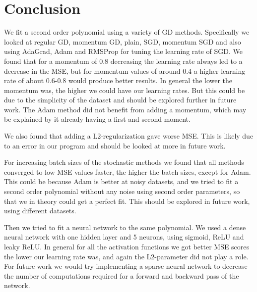 \section{Conclusion}

We fit a second order polynomial using a variety of GD methods. Specifically we
looked at regular GD, momentum GD, plain, SGD, momentum SGD and also using AdaGrad, Adam 
and RMSProp for tuning the learning rate of SGD. We found that for a momentum
of 0.8 decreasing the learning rate always led to a decrease in the MSE, but
for momentum values of around 0.4 a higher learning rate of about 0.6-0.8 would
produce better results. In general the lower the momentum was, the higher we
could have our learning rates. But this could be due to the simplicity of the
dataset and should be explored further in future work. The Adam method did not
benefit from adding a momentum, which may be explained by it already having a
first and second moment. 

We also found that adding a L2-regularization gave worse MSE. 
This is likely due to an error in our program and should be
looked at more in future work. 

For increasing batch sizes of the stochastic methods we found that all methods
converged to low MSE values faster, the higher the batch sizes, except for
Adam. This could be because Adam is better at noisy datasets, and we tried to
fit a second order polynomial without any noise using second order parameters,
so that we in theory could get a perfect fit. This should be explored in future
work, using different datasets.


Then we tried to fit a neural network to the same polynomial. We used a dense
neural network with one hidden layer and 5 neurons, using sigmoid, ReLU and
leaky ReLU. In general for all the activation functions we got better MSE
scores the lower our learning rate was, and again the L2-parameter did not play
a role. For future work we would try implementing a sparse neural network to
decrease the number of computations required for a forward and backward pass of
the network. 



